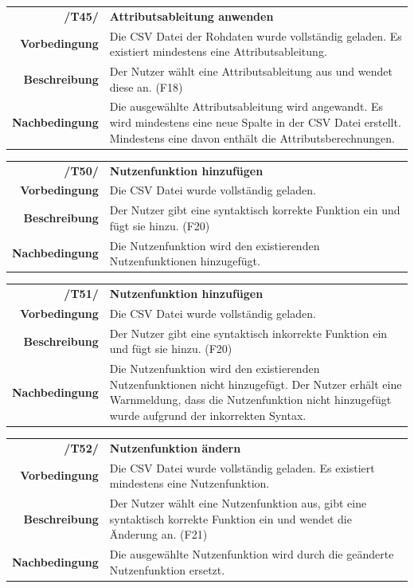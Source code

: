 \documentclass{article}
\begin{document}
\begin{table}[H]
\begin{tabularx}{\textwidth}{rX}
\textbf{/T45/}         & \textbf{Attributsableitung anwenden} \\
\textbf{Vorbedingung}  & Die CSV Datei der Rohdaten wurde vollständig geladen. Es existiert mindestens eine Attributsableitung.  \\
\textbf{Beschreibung}  & Der Nutzer wählt eine Attributsableitung aus und wendet diese an. (F18) \\
\textbf{Nachbedingung} & Die ausgewählte Attributsableitung wird angewandt. Es wird mindestens eine neue Spalte in der CSV Datei erstellt. Mindestens eine davon enthält die Attributsberechnungen.
\end{tabularx}
\end{table}

\begin{table}[H]
\begin{tabularx}{\textwidth}{rX}
\textbf{/T50/}         & \textbf{Nutzenfunktion hinzufügen} \\
\textbf{Vorbedingung}  & Die CSV Datei wurde vollständig geladen.   \\
\textbf{Beschreibung}  & Der Nutzer gibt eine syntaktisch korrekte Funktion ein und fügt sie hinzu. (F20) \\
\textbf{Nachbedingung} & Die Nutzenfunktion wird den existierenden Nutzenfunktionen hinzugefügt.
\end{tabularx}
\end{table}

\begin{table}[H]
\begin{tabularx}{\textwidth}{rX}
\textbf{/T51/}         & \textbf{Nutzenfunktion hinzufügen} \\
\textbf{Vorbedingung}  & Die CSV Datei wurde vollständig geladen.   \\
\textbf{Beschreibung}  & Der Nutzer gibt eine syntaktisch inkorrekte Funktion ein und fügt sie hinzu. (F20) \\
\textbf{Nachbedingung} & Die Nutzenfunktion wird den existierenden Nutzenfunktionen nicht hinzugefügt. Der Nutzer erhält eine Warnmeldung, dass die Nutzenfunktion nicht hinzugefügt wurde aufgrund der inkorrekten Syntax.
\end{tabularx}
\end{table}

\begin{table}[H]
\begin{tabularx}{\textwidth}{rX}
\textbf{/T52/}         & \textbf{Nutzenfunktion ändern} \\
\textbf{Vorbedingung}  & Die CSV Datei wurde vollständig geladen. Es existiert mindestens eine Nutzenfunktion.  \\
\textbf{Beschreibung}  & Der Nutzer wählt eine Nutzenfunktion aus, gibt eine syntaktisch korrekte Funktion ein und wendet die Änderung an. (F21) \\
\textbf{Nachbedingung} & Die ausgewählte Nutzenfunktion wird durch die geänderte Nutzenfunktion ersetzt.
\end{tabularx}
\end{table}
\end{document}
